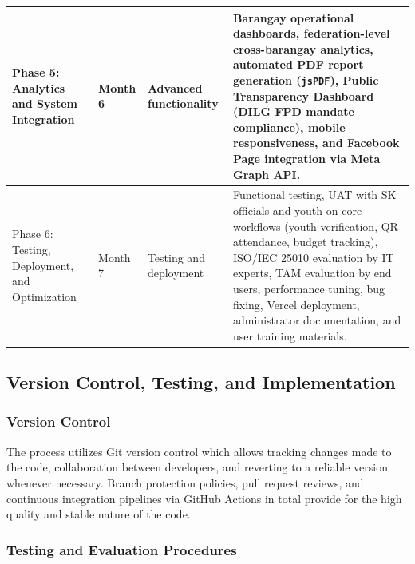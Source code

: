 \begin{longtable}{|p{3cm}|p{2cm}|p{3.5cm}|p{6cm}|}
Phase 5: Analytics and System Integration & Month 6 & Advanced functionality & Barangay operational dashboards, federation-level cross-barangay analytics, automated PDF report generation (\texttt{jsPDF}), Public Transparency Dashboard (DILG FPD mandate compliance), mobile responsiveness, and Facebook Page integration via Meta Graph API. \\ \hline

Phase 6: Testing, Deployment, and Optimization & Month 7 & Testing and deployment & Functional testing, UAT with SK officials and youth on core workflows (youth verification, QR attendance, budget tracking), ISO/IEC 25010 evaluation by IT experts, TAM evaluation by end users, performance tuning, bug fixing, Vercel deployment, administrator documentation, and user training materials. \\ \hline

\end{longtable}
\vspace{5mm}

\subsection{Version Control, Testing, and Implementation}
\label{subsec:version_control_testing_implementation}

\subsubsection{Version Control}
\label{subsubsec:version_control}

\hspace*{\parindent}The process utilizes Git version control which allows tracking changes made to the code, collaboration between developers, and reverting to a reliable version whenever necessary. Branch protection policies, pull request reviews, and continuous integration pipelines via GitHub Actions in total provide for the high quality and stable nature of the code.
\vspace{3mm}

\subsubsection{Testing and Evaluation Procedures}
\label{subsubsec:testing_and_evaluation_procedures}

